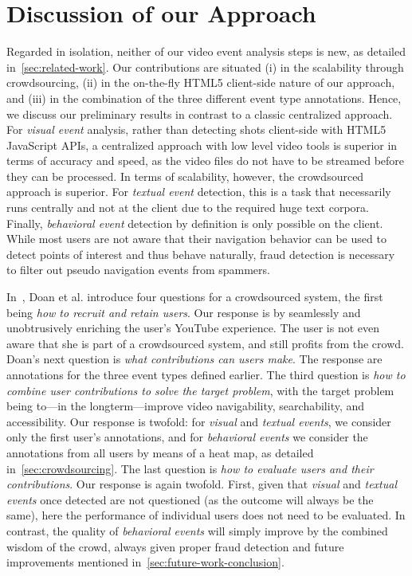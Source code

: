 \documentclass[runningheads,a4paper]{llncs}
\begin{document}
\vspace{-5mm}
\section{Discussion of our Approach}
Regarded in isolation, neither of our video event analysis steps is new, as detailed in~\autoref{sec:related-work}. Our contributions are situated (i) in the scalability through crowdsourcing, (ii) in the on-the-fly HTML5 client-side nature of our approach, and (iii) in the combination of the three different event type annotations. Hence, we discuss our preliminary results in contrast to a classic centralized approach. For \emph{visual event} analysis, rather than detecting shots client-side with HTML5 Java\-Script APIs, a centralized approach with low level video tools is superior in terms of accuracy and speed, as the video files do not have to be streamed before they can be processed. In terms of scalability, however, the crowdsourced approach is superior. For \emph{textual event} detection, this is a task that necessarily runs centrally and not at the client due to the required huge text corpora. Finally, \emph{behavioral event} detection by definition is only possible on the client. While most users are not aware that their navigation behavior can be used to detect points of interest and thus behave naturally, fraud detection is necessary to filter out pseudo navigation events from spammers.

In~\cite{Doan:2011}, Doan et al. introduce four questions for a crowdsourced system, the first being \textit{how to recruit and retain users}. Our response is by seamlessly and unobtrusively enriching the user's YouTube experience. The user is not even aware that she is part of a crowdsourced system, and still profits from the crowd. Doan's next question is \textit{what contributions can users make}. The response are annotations for the three event types defined earlier. The third question is \textit{how to combine user contributions to solve the target problem}, with the target problem being to---in the longterm---improve video navigability, searchability, and accessibility.  Our response is twofold: for \emph{visual} and \emph{textual events}, we consider only the first user's annotations, and for \emph{behavioral events} we consider the annotations from all users by means of a heat map, as detailed in~\autoref{sec:crowdsourcing}. The last question is \textit{how to evaluate users and their contributions}. Our response is again twofold. First, given that \emph{visual} and \emph{textual events} once detected are not questioned (as the outcome will always be the same), here the performance of individual users does not need to be evaluated. In contrast, the quality of \emph{behavioral events}  will simply improve by the combined wisdom of the crowd, always given proper fraud detection and future improvements mentioned in~\autoref{sec:future-work-conclusion}.
\end{document}
